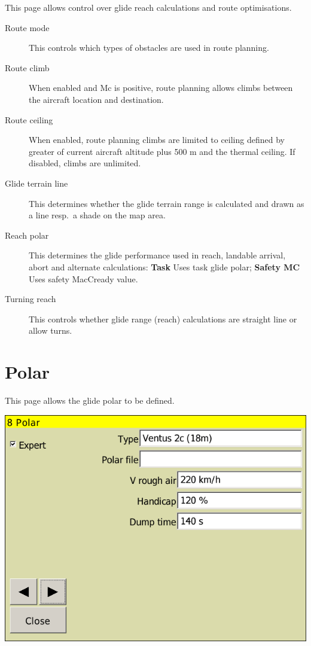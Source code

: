 This page allows control over glide reach calculations and route
optimisations.

\begin{description}
\item[Route mode] \label{conf:routemode} This controls which types
of obstacles are used in route planning.
\item[Route climb] \label{conf:routeclimb} When enabled and Mc is positive, route planning allows climbs between the
  aircraft location and destination.
\item[Route ceiling] \label{conf:routeceiling} When enabled, route planning climbs are limited to ceiling defined by greater of current aircraft altitude plus 500 m and the thermal ceiling.  If disabled, climbs are unlimited.
\item[Glide terrain line]  \label{conf:gliderange} This determines whether the
glide terrain range is calculated and drawn as a line resp.\ a shade on the map area.
\item[Reach polar] \label{conf:reachpolar} This determines the glide performance used in reach, landable arrival, abort and alternate calculations: {\bf Task} Uses task glide polar; {\bf Safety MC} Uses safety MacCready value.
\item[Turning reach] \label{conf:turningreach} This controls whether glide range (reach) calculations
are straight line or allow turns.
\end{description}

\clearpage
\section{Polar}

This page allows the glide polar to be defined.

\begin{center}
\includegraphics[angle=0,width=0.8\linewidth,keepaspectratio='true']{figures/config-polar.png}
\end{center}

